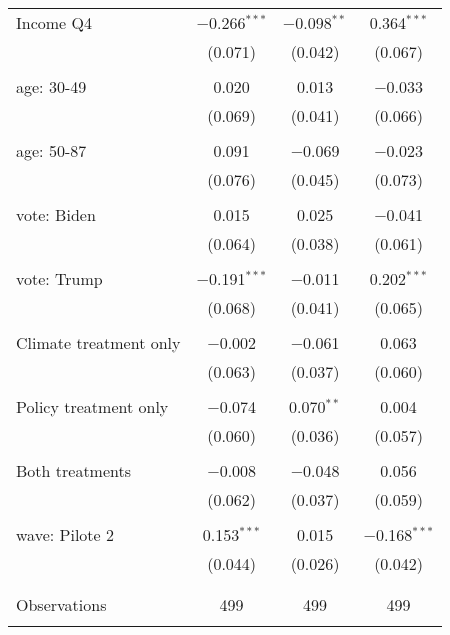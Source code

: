 \begin{tabular}{@{\extracolsep{5pt}}lccc}
 Income Q4 & $-$0.266$^{***}$ & $-$0.098$^{**}$ & 0.364$^{***}$ \\ 
  & (0.071) & (0.042) & (0.067) \\ 
  & & & \\ 
 age: 30-49 & 0.020 & 0.013 & $-$0.033 \\ 
  & (0.069) & (0.041) & (0.066) \\ 
  & & & \\ 
 age: 50-87 & 0.091 & $-$0.069 & $-$0.023 \\ 
  & (0.076) & (0.045) & (0.073) \\ 
  & & & \\ 
 vote: Biden & 0.015 & 0.025 & $-$0.041 \\ 
  & (0.064) & (0.038) & (0.061) \\ 
  & & & \\ 
 vote: Trump & $-$0.191$^{***}$ & $-$0.011 & 0.202$^{***}$ \\ 
  & (0.068) & (0.041) & (0.065) \\ 
  & & & \\ 
 Climate treatment only & $-$0.002 & $-$0.061 & 0.063 \\ 
  & (0.063) & (0.037) & (0.060) \\ 
  & & & \\ 
 Policy treatment only & $-$0.074 & 0.070$^{**}$ & 0.004 \\ 
  & (0.060) & (0.036) & (0.057) \\ 
  & & & \\ 
 Both treatments & $-$0.008 & $-$0.048 & 0.056 \\ 
  & (0.062) & (0.037) & (0.059) \\ 
  & & & \\ 
 wave: Pilote 2 & 0.153$^{***}$ & 0.015 & $-$0.168$^{***}$ \\ 
  & (0.044) & (0.026) & (0.042) \\ 
  & & & \\ 
\hline \\[-1.8ex] 

Observations & 499 & 499 & 499 \\ 
\hline 
\hline \\[-1.8ex] 
\end{tabular} 